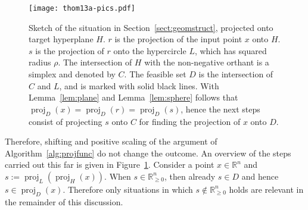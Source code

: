 \documentclass[twoside,11pt]{article}
\DeclareMathOperator{\proj}{proj}
\newcommand{\R}{\mathbb{R}}
\newcommand{\0}{\mathcal{O}}
\begin{document}
\begin{figure}[t]
  \centering
  \texttt{[image: thom13a-pics.pdf]}
  \caption{Sketch of the situation in Section~\ref{sect:geomstruct}, projected onto target hyperplane $H$. $r$ is the projection of the input point $x$ onto $H$. $s$ is the projection of $r$ onto the hypercircle $L$, which has squared radius $\rho$. The intersection of $H$ with the non-negative orthant is a simplex and denoted by $C$. The feasible set $D$ is the intersection of $C$ and $L$, and is marked with solid black lines. With Lemma~\ref{lem:plane} and Lemma~\ref{lem:sphere} follows that $\proj_D(x) = \proj_D(r) = \proj_D(s)$, hence the next steps consist of projecting $s$ onto $C$ for finding the projection of $x$ onto $D$.}
  \label{fig:theplot3d-nonneg}
\end{figure}
Therefore, shifting and positive scaling of the argument of Algorithm~\ref{alg:projfunc} do not change the outcome.
An overview of the steps carried out this far is given in Figure~\ref{fig:theplot3d-nonneg}.
Consider a point $x\in\R^n$ and $s := \proj_L(\proj_H(x))$.
When $s\in\R_{\geq 0}^n$, then already $s\in D$ and hence $s\in\proj_D(x)$.
Therefore only situations in which $s\not\in\R_{\geq 0}^n$ holds are relevant in the remainder of this discussion.
\end{document}
